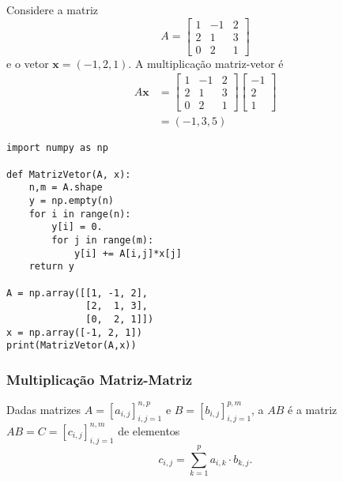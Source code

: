 \begin{ex}
  Considere a matriz
  \begin{equation}
    A =
    \begin{bmatrix}
      1 & -1 & 2\\
      2 & 1 & 3\\
      0 & 2 & 1
    \end{bmatrix}
  \end{equation}
  e o vetor $\pmb{x} = (-1, 2, 1)$. A multiplicação matriz-vetor é
  \begin{subequations}
    \begin{align}
      A\pmb{x} &= \begin{bmatrix}
        1 & -1 & 2\\
        2 & 1 & 3\\
        0 & 2 & 1
      \end{bmatrix}
      \begin{bmatrix}
        -1\\
        2\\
        1
      \end{bmatrix}\\
               &= (-1, 3, 5)
    \end{align}
   \end{subequations}

\begin{lstlisting}
import numpy as np

def MatrizVetor(A, x):
    n,m = A.shape
    y = np.empty(n)
    for i in range(n):
        y[i] = 0.
        for j in range(m):
            y[i] += A[i,j]*x[j]
    return y

A = np.array([[1, -1, 2],
              [2,  1, 3],
              [0,  2, 1]])
x = np.array([-1, 2, 1])
print(MatrizVetor(A,x))
\end{lstlisting}

\end{ex}

\subsubsection{Multiplicação Matriz-Matriz}

Dadas matrizes $A = [a_{i,j}]_{i,j=1}^{n,p}$ e $B = [b_{i,j}]_{i,j=1}^{p,m}$, a  $AB$ é a matriz $AB = C = [c_{i,j}]_{i,j=1}^{n,m}$ de elementos
\begin{equation}
  c_{i,j} = \sum_{k=1}^{p} a_{i,k}\cdot b_{k,j}.
\end{equation}

